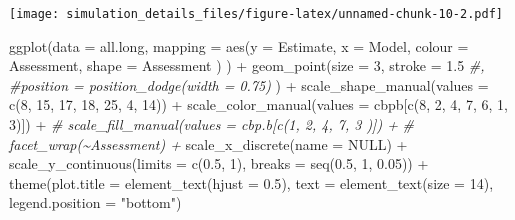 \documentclass[
]{article}
\newenvironment{Shaded}{\begin{snugshade}}{\end{snugshade}}
\newcommand{\AttributeTok}[1]{\textcolor[rgb]{0.77,0.63,0.00}{#1}}
\newcommand{\CommentTok}[1]{\textcolor[rgb]{0.56,0.35,0.01}{\textit{#1}}}
\newcommand{\ConstantTok}[1]{\textcolor[rgb]{0.00,0.00,0.00}{#1}}
\newcommand{\DecValTok}[1]{\textcolor[rgb]{0.00,0.00,0.81}{#1}}
\newcommand{\FloatTok}[1]{\textcolor[rgb]{0.00,0.00,0.81}{#1}}
\newcommand{\FunctionTok}[1]{\textcolor[rgb]{0.00,0.00,0.00}{#1}}
\newcommand{\NormalTok}[1]{#1}
\newcommand{\SpecialCharTok}[1]{\textcolor[rgb]{0.00,0.00,0.00}{#1}}
\newcommand{\StringTok}[1]{\textcolor[rgb]{0.31,0.60,0.02}{#1}}
\begin{document}
\texttt{[image: simulation\_details\_files/figure-latex/unnamed-chunk-10-2.pdf]}

\begin{Shaded}
\begin{Highlighting}[]
\FunctionTok{ggplot}\NormalTok{(}\AttributeTok{data =}\NormalTok{ all.long,}
       \AttributeTok{mapping =} \FunctionTok{aes}\NormalTok{(}\AttributeTok{y =}\NormalTok{ Estimate,}
                     \AttributeTok{x =}\NormalTok{ Model, }
                     \AttributeTok{colour =}\NormalTok{ Assessment,}
                     \AttributeTok{shape =}\NormalTok{ Assessment}
\NormalTok{                     )}
\NormalTok{       ) }\SpecialCharTok{+}
  \FunctionTok{geom\_point}\NormalTok{(}\AttributeTok{size =} \DecValTok{3}\NormalTok{, }\AttributeTok{stroke =} \FloatTok{1.5}
             \CommentTok{\#,}
             \CommentTok{\#position = position\_dodge(width = 0.75)}
\NormalTok{             ) }\SpecialCharTok{+}
  \FunctionTok{scale\_shape\_manual}\NormalTok{(}\AttributeTok{values =} \FunctionTok{c}\NormalTok{(}\DecValTok{8}\NormalTok{, }\DecValTok{15}\NormalTok{, }\DecValTok{17}\NormalTok{, }\DecValTok{18}\NormalTok{, }\DecValTok{25}\NormalTok{, }\DecValTok{4}\NormalTok{, }\DecValTok{14}\NormalTok{)) }\SpecialCharTok{+}
  \FunctionTok{scale\_color\_manual}\NormalTok{(}\AttributeTok{values =}\NormalTok{ cbpb[}\FunctionTok{c}\NormalTok{(}\DecValTok{8}\NormalTok{, }\DecValTok{2}\NormalTok{, }\DecValTok{4}\NormalTok{, }\DecValTok{7}\NormalTok{, }\DecValTok{6}\NormalTok{, }\DecValTok{1}\NormalTok{, }\DecValTok{3}\NormalTok{)]) }\SpecialCharTok{+}
  \CommentTok{\# scale\_fill\_manual(values = cbp.b[c(1, 2, 4, 7, 3 )]) +}
  \CommentTok{\# facet\_wrap(\textasciitilde{}Assessment) +}
  \FunctionTok{scale\_x\_discrete}\NormalTok{(}\AttributeTok{name =} \ConstantTok{NULL}\NormalTok{) }\SpecialCharTok{+}
  \FunctionTok{scale\_y\_continuous}\NormalTok{(}\AttributeTok{limits =} \FunctionTok{c}\NormalTok{(}\FloatTok{0.5}\NormalTok{, }\DecValTok{1}\NormalTok{),}
                     \AttributeTok{breaks =} \FunctionTok{seq}\NormalTok{(}\FloatTok{0.5}\NormalTok{, }\DecValTok{1}\NormalTok{, }\FloatTok{0.05}\NormalTok{)) }\SpecialCharTok{+}
  \FunctionTok{theme}\NormalTok{(}\AttributeTok{plot.title =} \FunctionTok{element\_text}\NormalTok{(}\AttributeTok{hjust =} \FloatTok{0.5}\NormalTok{), }
        \AttributeTok{text =} \FunctionTok{element\_text}\NormalTok{(}\AttributeTok{size =} \DecValTok{14}\NormalTok{),}
        \AttributeTok{legend.position =} \StringTok{"bottom"}\NormalTok{)}
\end{Highlighting}
\end{Shaded}
\end{document}
